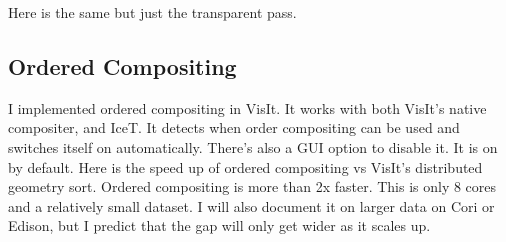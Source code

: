 \documentclass[a4paper,10pt]{report}
\begin{document}
Here is the same but just the transparent pass.


\subsection{Ordered Compositing}
I implemented ordered compositing in VisIt. It works with both VisIt's native compositer, and IceT. It detects when order compositing can be used and switches itself on automatically. There's also a GUI option to disable it. It is on by default. Here is the speed up of ordered compositing vs VisIt's distributed geometry sort. Ordered compositing is more than 2x faster. This is only 8 cores and a relatively small dataset. I will also document it on larger data on Cori or Edison, but I predict that the gap will only get wider as it scales up.
\end{document}
